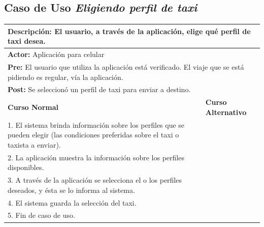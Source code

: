 \documentclass[a4paper]{article}
\begin{document}
\subsection{Caso de Uso \textit{Eligiendo perfil de taxi}}
\begin{center}
\begin{tabular}{|p{10cm} | p{6cm}|}
\hline
\multicolumn{2}{|p{16cm}|}{\textbf{Descripci\'on:} El usuario, a trav\'es de la aplicaci\'on, elige qu\'e perfil de taxi desea.} \\
\hline
\multicolumn{2}{|p{15cm}|}{\textbf{Actor:} Aplicaci\'on para celular } \\
\hline
\multicolumn{2}{|p{15cm}|}{\textbf{Pre:} El usuario que utiliza la aplicaci\'on est\'a verificado. El viaje que se est\'a pidiendo es regular, v\'ia la aplicaci\'on.} \\
\hline
\multicolumn{2}{|p{15cm}|}{\textbf{Post:} Se seleccion\'o un perfil de taxi para enviar a destino.}\\
\hline
\textbf{Curso Normal}  & \textbf{Curso Alternativo} \\ \hline
1. El sistema brinda informaci\'on sobre los perfiles que se pueden elegir (las condiciones preferidas sobre el taxi o taxista a enviar).  & \\ \hline
2. La aplicaci\'on muestra la informaci\'on sobre los perfiles disponibles. & \\ \hline
3. A trav\'es de la aplicaci\'on se selecciona el o los perfiles deseados, y \'esta se lo informa al sistema. & \\ \hline
4. El sistema guarda la selecci\'on del taxi. & \\ \hline
5. Fin de caso de uso. & \\ \hline
\end{tabular}
\end{center}
\end{document}
